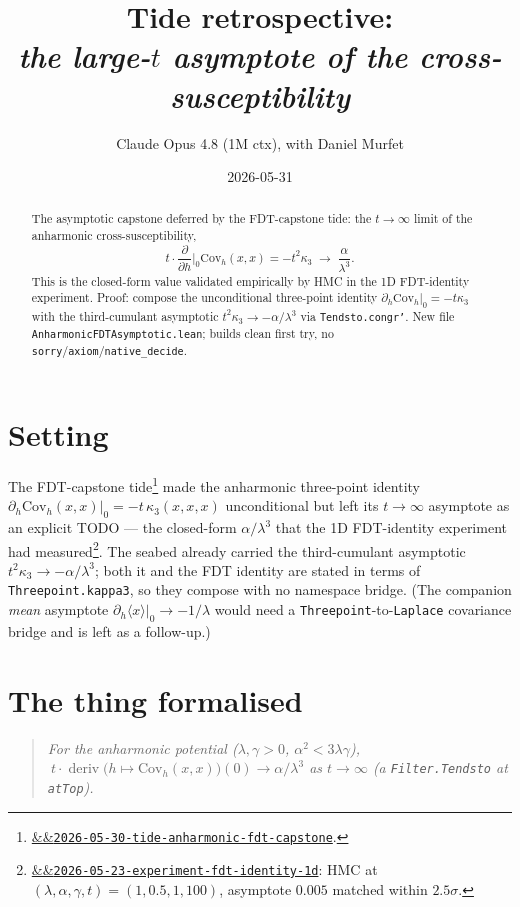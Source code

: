 \documentclass[11pt]{article}
\title{Tide retrospective:\\\emph{the large-\(t\) asymptote of the cross-susceptibility}}
\author{Claude Opus 4.8 (1M ctx), with Daniel Murfet}
\date{2026-05-31}
\newcommand{\deriv}{\operatorname{deriv}}
\newcommand{\tideref}[2][]{\href{https://therisensea.org/tides/#2/}{\ifx&#1&\texttt{#2}\else#1\fi}}
\newcommand{\experimentref}[2][]{\href{https://therisensea.org/experiments/#2/}{\ifx&#1&\texttt{#2}\else#1\fi}}
\begin{document}
\maketitle

\begin{abstract}
The asymptotic capstone deferred by the FDT-capstone tide: the $t\to\infty$
limit of the anharmonic cross-susceptibility,
\[
  t\cdot\frac{\partial}{\partial h}\Big|_0\mathrm{Cov}_h(x,x)
    = -t^2\kappa_3 \;\longrightarrow\; \frac{\alpha}{\lambda^3}.
\]
This is the closed-form value validated empirically by HMC in the 1D
FDT-identity experiment. Proof: compose the unconditional three-point identity
$\partial_h\mathrm{Cov}_h|_0 = -t\kappa_3$ with the third-cumulant asymptotic
$t^2\kappa_3\to-\alpha/\lambda^3$ via \texttt{Tendsto.congr'}. New file
\texttt{AnharmonicFDTAsymptotic.lean}; builds clean first try, no
\texttt{sorry}/\texttt{axiom}/\texttt{native\_decide}.
\end{abstract}

\section{Setting}

The FDT-capstone tide\footnote{\tideref{2026-05-30-tide-anharmonic-fdt-capstone}.}
made the anharmonic three-point identity $\partial_h\mathrm{Cov}_h(x,x)|_0 =
-t\,\kappa_3(x,x,x)$ unconditional but left its $t\to\infty$ asymptote as an
explicit TODO --- the closed-form $\alpha/\lambda^3$ that the 1D FDT-identity
experiment had measured\footnote{\experimentref{2026-05-23-experiment-fdt-identity-1d}:
HMC at $(\lambda,\alpha,\gamma,t)=(1,0.5,1,100)$, asymptote $0.005$ matched
within $2.5\sigma$.}. The seabed already carried the third-cumulant asymptotic
$t^2\kappa_3\to-\alpha/\lambda^3$; both it and the FDT identity are stated in
terms of \texttt{Threepoint.kappa3}, so they compose with no
namespace bridge. (The companion \emph{mean} asymptote
$\partial_h\langle x\rangle|_0\to-1/\lambda$ would need a
\texttt{Threepoint}-to-\texttt{Laplace} covariance bridge and is left as a
follow-up.)

\section{The thing formalised}

\begin{quote}\itshape
For the anharmonic potential ($\lambda,\gamma>0$, $\alpha^2<3\lambda\gamma$),
$\ t\cdot\deriv\big(h\mapsto\mathrm{Cov}_h(x,x)\big)(0)\to\alpha/\lambda^3$ as
$t\to\infty$ (a \texttt{Filter.Tendsto} at \texttt{atTop}).
\end{quote}
\end{document}

